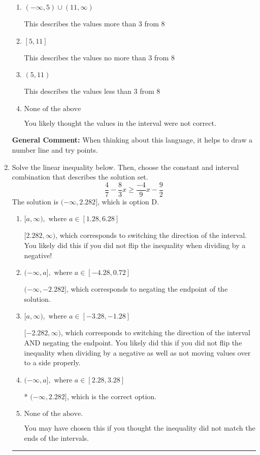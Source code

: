 \documentclass{extbook}[14pt]
\newcommand{\litem}[1]{\item #1

\rule{\textwidth}{0.4pt}}
\begin{document}
\begin{enumerate}
{\begin{enumerate}[label=\Alph*.]
This describes the values no less than 3 from 8
\item \( (-\infty, 5) \cup (11, \infty) \)

This describes the values more than 3 from 8
\item \( [5, 11] \)

This describes the values no more than 3 from 8
\item \( (5, 11) \)

This describes the values less than 3 from 8
\item \( \text{None of the above} \)

You likely thought the values in the interval were not correct.
\end{enumerate}

\textbf{General Comment:} When thinking about this language, it helps to draw a number line and try points.
}
\litem{
Solve the linear inequality below. Then, choose the constant and interval combination that describes the solution set.
\[ \frac{4}{7} - \frac{8}{3} x \geq \frac{-4}{9} x - \frac{9}{2} \]
The solution is \( (-\infty, 2.282] \), which is option D.\begin{enumerate}[label=\Alph*.]
\item \( [a, \infty), \text{ where } a \in [1.28, 6.28] \)

 $[2.282, \infty)$, which corresponds to switching the direction of the interval. You likely did this if you did not flip the inequality when dividing by a negative!
\item \( (-\infty, a], \text{ where } a \in [-4.28, 0.72] \)

 $(-\infty, -2.282]$, which corresponds to negating the endpoint of the solution.
\item \( [a, \infty), \text{ where } a \in [-3.28, -1.28] \)

 $[-2.282, \infty)$, which corresponds to switching the direction of the interval AND negating the endpoint. You likely did this if you did not flip the inequality when dividing by a negative as well as not moving values over to a side properly.
\item \( (-\infty, a], \text{ where } a \in [2.28, 3.28] \)

* $(-\infty, 2.282]$, which is the correct option.
\item \( \text{None of the above}. \)

You may have chosen this if you thought the inequality did not match the ends of the intervals.
\end{enumerate}

}
\end{enumerate}
\end{document}
